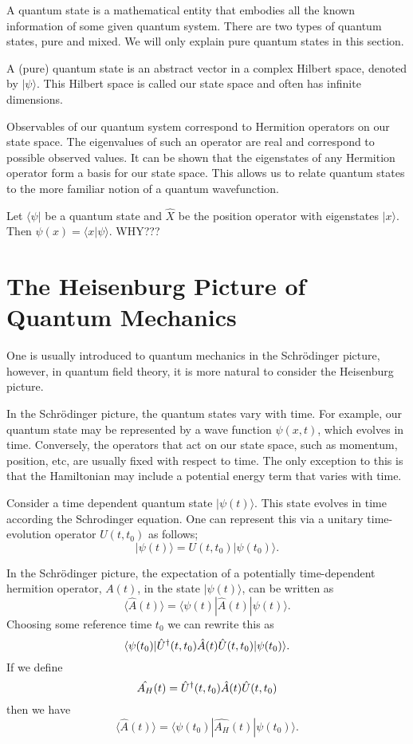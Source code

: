 \documentclass{article}
\theoremstyle{definition}
\theoremstyle{plain}
\begin{document}
A quantum state is a mathematical entity that embodies all 
the known information of some given quantum system. There 
are two types of quantum states, pure and mixed. We will 
only explain pure quantum states in this section.

A (pure) quantum state is an abstract vector in a complex 
Hilbert space, denoted by $| \psi \rangle $. This Hilbert 
space is called our state space and often has infinite 
dimensions.

Observables of our quantum system correspond to Hermition 
operators on our state space. The eigenvalues of such an 
operator are real and correspond to possible observed 
values. It can be shown that the eigenstates of any 
Hermition operator form a basis for our state space. This 
allows us to relate quantum states to the more familiar 
notion of a quantum wavefunction.

Let $\langle \psi |$ be a quantum state and $\hat{X}$ be the position operator with eigenstates $|x \rangle$. Then $\psi (x) = \langle x | \psi \rangle$. WHY???


\section{The Heisenburg Picture of Quantum Mechanics}

One is usually introduced to quantum mechanics in the 
Schrödinger picture, however, in quantum field theory, 
it is more natural to consider the Heisenburg picture.

In the Schrödinger picture, the quantum states vary with 
time. For example, our quantum state may be represented 
by a wave function $\psi(x,t)$, which evolves in time. 
Conversely,
the operators that act on our state space, such as 
momentum, position, etc, are usually fixed with respect to time. 
The only exception to this is that the Hamiltonian may include 
a potential energy term that varies with time. 

Consider a time dependent quantum state 
$| \psi(t) \rangle$. This state evolves in time 
according the  Schrodinger equation. One can 
represent this via a unitary time-evolution operator 
$U(t,t_0)$ 
as follows;
\[ | \psi(t) \rangle = U(t,t_0) | \psi(t_0) \rangle .\]

In the Schrödinger 
picture, the expectation of a potentially time-dependent hermition operator, $A(t)$, in the 
state $| \psi(t) \rangle$,  can be written as 
\[\langle \hat{A}(t) \rangle = \langle \psi(t) | \hat{A}(t) | \psi(t) \rangle.\]
Choosing some reference time $t_0$ we can rewrite this as
\[\langle \psi(t_0) | \hat{U}\textsuperscript{\textdagger}(t,t_0) \hat{A}  (t) \hat{U}(t,t_0) | \psi(t_0) \rangle.\]
If we define 
\[\hat{A_H}(t) = \hat{U}\textsuperscript{\textdagger}(t,t_0) \hat{A}  (t) \hat{U}(t,t_0) \]
then we have 
\[\langle \hat{A}(t) \rangle = \langle \psi(t_0) | \hat{A_H}(t) | \psi(t_0) \rangle.\]
\end{document}
